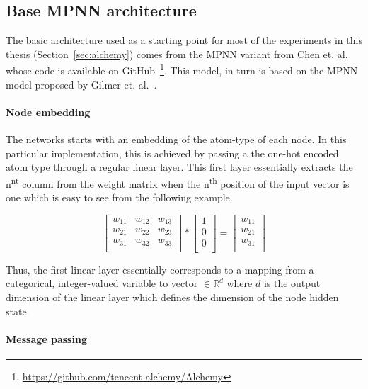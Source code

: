 \subsection{Base MPNN architecture}
\label{sec:mpnn-architecture}

The basic architecture used as a starting point for most of the experiments in this thesis (Section~\ref{sec:alchemy}) comes from the MPNN variant from Chen et. al.~\cite{Chen2019} whose code is available on GitHub~\footnote{\url{https://github.com/tencent-alchemy/Alchemy}}. This model, in turn is based on the MPNN model proposed by Gilmer et. al.~\cite{Gilmer2017}.


\paragraph{Node embedding}The networks starts with an embedding of the atom-type of each node. In this particular implementation, this is achieved by passing a the one-hot encoded atom type through a regular linear layer. This first layer essentially extracts the n\textsuperscript{nt} column from the weight matrix when the n\textsuperscript{th} position of the input vector is one which is easy to see from the following example.

\begin{equation}
\begin{bmatrix} 
w_{11} & w_{12} & w_{13} \\
w_{21} & w_{22} & w_{23} \\
w_{31} & w_{32} & w_{33} \\
\end{bmatrix}
*
\begin{bmatrix} 
1 \\
0 \\
0 \\
\end{bmatrix}
=
\begin{bmatrix} 
w_{11} \\
w_{21} \\
w_{31} \\
\end{bmatrix}
\end{equation}

Thus, the first linear layer essentially corresponds to a mapping from a categorical, integer-valued variable to vector $\in \mathbb{R}^d$ where $d$ is the output dimension of the linear layer which defines the dimension of the node hidden state.

\paragraph{Message passing}

